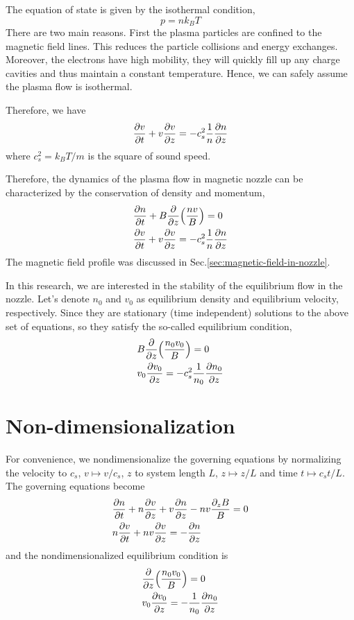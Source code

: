 The equation of state is given by the isothermal condition,
\begin{equation} \label{eq:eos}
	p = nk_BT
\end{equation}
There are two main reasons. First the plasma particles are confined to the magnetic field lines. This reduces the particle collisions and energy exchanges. Moreover, the electrons have high mobility, they will quickly fill up any charge cavities and thus maintain a constant temperature. Hence, we can safely assume the plasma flow is isothermal.

Therefore, we have
\begin{equation}
	\pdv{v}{t} + v\pdv{v}{z} = -c_s^2\frac{1}{n}\pdv{n}{z}
\end{equation}
where $c_s^2 = k_BT/m$ is the square of sound speed.

Therefore, the dynamics of the plasma flow in magnetic nozzle can be characterized by the conservation of density and momentum,
\begin{align*}
	 & \pdv{n}{t} + B\pdv{z}(\frac{nv}{B}) = 0                \\
	 & \pdv{v}{t} + v\pdv{v}{z} = -c_s^2\frac{1}{n}\pdv{n}{z}
\end{align*}
The magnetic field profile was discussed in Sec.\ref{sec:magnetic-field-in-nozzle}.

In this research, we are interested in the stability of the equilibrium flow in the nozzle. Let's denote $n_0$ and $v_0$ as equilibrium density and equilibrium velocity, respectively. Since they are stationary (time independent) solutions to the above set of equations, so they satisfy the so-called equilibrium condition,
\begin{align*}
	 & B\pdv{z}(\frac{n_0v_0}{B})  = 0                   \\
	 & v_0\pdv{v_0}{z} = -c_s^2\frac{1}{n_0}\pdv{n_0}{z}
\end{align*}

\section{Non-dimensionalization}
For convenience, we nondimensionalize the governing equations by normalizing the velocity to $c_s$, $v\mapsto v/c_s$, $z$ to system length $L$, $z \mapsto z/L$ and time $t\mapsto c_s t/L$. The governing equations become
\begin{align}
	 & \pdv{n}{t} + n\pdv{v}{z} + v\pdv{n}{z} - nv\frac{\partial_z B}{B} = 0
	\label{eq:conservation-of-density}
	\\
	 & n\pdv{v}{t} + nv\pdv{v}{z} = -\pdv{n}{z}
	\label{eq:conservation-of-momentum}
\end{align}
and the nondimensionalized equilibrium condition is
\begin{align}
	 & \pdv{z}(\frac{n_0v_0}{B}) = 0 \label{eq:equilibrium-conservation-of-density}                 \\
	 & v_0\pdv{v_0}{z} = -\frac{1}{n_0}\pdv{n_0}{z} \label{eq:equilibrium-conservation-of-momentum}
\end{align}

